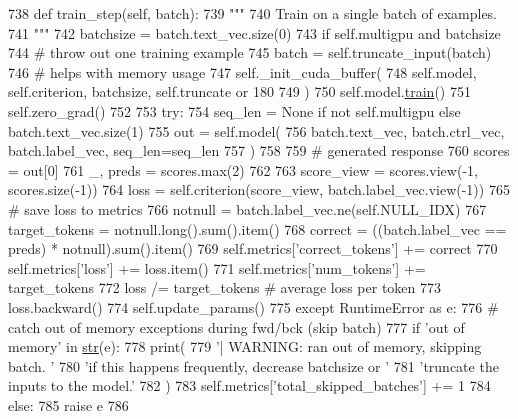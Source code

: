 \begin{DoxyCode}
738     \textcolor{keyword}{def }train\_step(self, batch):
739         \textcolor{stringliteral}{"""}
740 \textcolor{stringliteral}{        Train on a single batch of examples.}
741 \textcolor{stringliteral}{        """}
742         batchsize = batch.text\_vec.size(0)
743         \textcolor{keywordflow}{if} self.multigpu \textcolor{keywordflow}{and} batchsize %
744             \textcolor{comment}{# throw out one training example}
745             batch = self.truncate\_input(batch)
746         \textcolor{comment}{# helps with memory usage}
747         self.\_init\_cuda\_buffer(
748             self.model, self.criterion, batchsize, self.truncate \textcolor{keywordflow}{or} 180
749         )
750         self.model.\hyperlink{namespaceprojects_1_1mastering__the__dungeon_1_1mturk_1_1tasks_1_1MTD_1_1run_a36a5f4f6f9df0611a6818610518d2cf0}{train}()
751         self.zero\_grad()
752 
753         \textcolor{keywordflow}{try}:
754             seq\_len = \textcolor{keywordtype}{None} \textcolor{keywordflow}{if} \textcolor{keywordflow}{not} self.multigpu \textcolor{keywordflow}{else} batch.text\_vec.size(1)
755             out = self.model(
756                 batch.text\_vec, batch.ctrl\_vec, batch.label\_vec, seq\_len=seq\_len
757             )
758 
759             \textcolor{comment}{# generated response}
760             scores = out[0]
761             \_, preds = scores.max(2)
762 
763             score\_view = scores.view(-1, scores.size(-1))
764             loss = self.criterion(score\_view, batch.label\_vec.view(-1))
765             \textcolor{comment}{# save loss to metrics}
766             notnull = batch.label\_vec.ne(self.NULL\_IDX)
767             target\_tokens = notnull.long().sum().item()
768             correct = ((batch.label\_vec == preds) * notnull).sum().item()
769             self.metrics[\textcolor{stringliteral}{'correct\_tokens'}] += correct
770             self.metrics[\textcolor{stringliteral}{'loss'}] += loss.item()
771             self.metrics[\textcolor{stringliteral}{'num\_tokens'}] += target\_tokens
772             loss /= target\_tokens  \textcolor{comment}{# average loss per token}
773             loss.backward()
774             self.update\_params()
775         \textcolor{keywordflow}{except} RuntimeError \textcolor{keyword}{as} e:
776             \textcolor{comment}{# catch out of memory exceptions during fwd/bck (skip batch)}
777             \textcolor{keywordflow}{if} \textcolor{stringliteral}{'out of memory'} \textcolor{keywordflow}{in} \hyperlink{namespacegenerate__task__READMEs_a5b88452ffb87b78c8c85ececebafc09f}{str}(e):
778                 print(
779                     \textcolor{stringliteral}{'| WARNING: ran out of memory, skipping batch. '}
780                     \textcolor{stringliteral}{'if this happens frequently, decrease batchsize or '}
781                     \textcolor{stringliteral}{'truncate the inputs to the model.'}
782                 )
783                 self.metrics[\textcolor{stringliteral}{'total\_skipped\_batches'}] += 1
784             \textcolor{keywordflow}{else}:
785                 \textcolor{keywordflow}{raise} e
786 
\end{DoxyCode}
